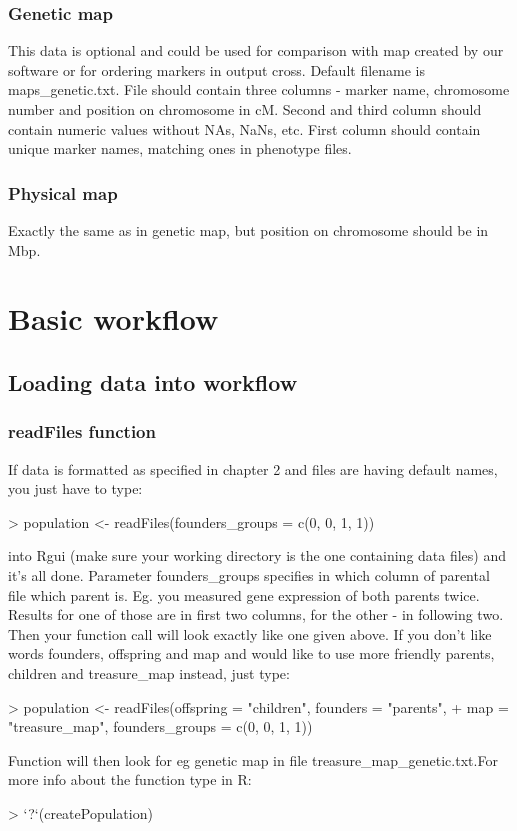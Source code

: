 \documentclass{article}
\begin{document}
\subsubsection{Genetic map}
This data is optional and could be used for comparison with map created by our software or for ordering markers in output cross. Default filename is maps\_genetic.txt. File should contain three columns - marker name, chromosome number and position on chromosome in cM. Second and third column should contain numeric values without NAs, NaNs, etc. First column should contain unique marker names, matching ones in phenotype files.
\subsubsection{Physical map}
Exactly the same as in genetic map, but position on chromosome should be in Mbp.

\newpage
\section{Basic workflow}
\subsection{Loading data into workflow}
\subsubsection{readFiles function}
If data is formatted as specified in chapter 2 and files are having default names, you just have to type: 
\begin{Schunk}
\begin{Sinput}
> population <- readFiles(founders_groups = c(0, 0, 1, 1))
\end{Sinput}
\end{Schunk}
 into Rgui (make sure your working directory is the one containing data files) and it's all done. Parameter founders\_groups specifies in which column of parental file which parent is. Eg. you measured gene expression of both parents twice. Results for one of those are in first two columns, for the other - in following two. Then your function call will look exactly like one given above. 
If you don't like words founders, offspring and map and would like to use more friendly parents, children and treasure\_map instead, just type:
\begin{Schunk}
\begin{Sinput}
> population <- readFiles(offspring = "children", founders = "parents", 
+     map = "treasure_map", founders_groups = c(0, 0, 1, 1))
\end{Sinput}
\end{Schunk}
{\noindent}Function will then look for eg genetic map in file treasure\_map\_genetic.txt.For more info about the function type in R:
\begin{Schunk}
\begin{Sinput}
> `?`(createPopulation)
\end{Sinput}
\end{Schunk}
\end{document}
